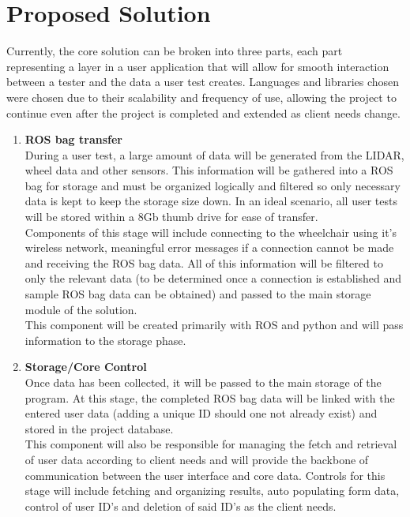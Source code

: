 \documentclass[onecolumn, draftclsnofoot,10pt, compsoc]{IEEEtran}
\begin{document}
\section{Proposed Solution}
Currently, the core solution can be broken into three parts, each part representing a layer in a user application that will allow for smooth interaction between a tester and the data a user test creates. Languages and libraries chosen were chosen due to their scalability and frequency of use, allowing the project to continue even after the project is completed and extended as client needs change.  
\begin{enumerate}
	\item \textbf{ROS bag transfer}\\
	During a user test, a large amount of data will be generated from the LIDAR, wheel data and other sensors. This information will be gathered into a ROS bag for storage and must be organized logically and filtered so only necessary data is kept to keep the storage size down. In an ideal scenario, all user tests  will be stored within a 8Gb thumb drive for ease of transfer.\\
	Components of this stage will include connecting to the wheelchair using it's wireless network, meaningful error messages if a connection cannot be made and receiving the ROS bag data. All of this information will be filtered to only the relevant data (to be determined once a connection is established and sample ROS bag data can be obtained) and passed to the main storage module of the solution.\\ 
	This component will be created primarily with ROS and python and will pass information to the storage phase. \\
	\item \textbf{Storage/Core Control}\\
	Once data has been collected, it will be passed to the main storage of the program. At this stage, the completed ROS bag data will be linked with the entered user data (adding a unique ID should one not already exist) and stored in the project database.\\
	This component will also be responsible for managing the fetch and retrieval of user data according to client needs and will provide the backbone of communication between the user interface and core data. Controls for this stage will include fetching and organizing results, auto populating form data, control of user ID's and deletion of said ID's as the client needs. \\

\end{enumerate}
\end{document}
